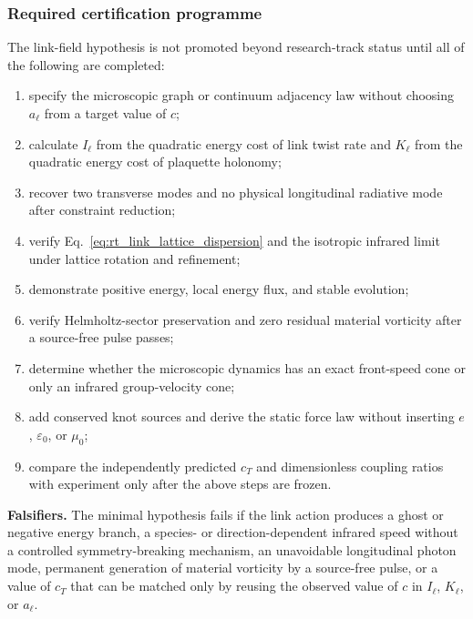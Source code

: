 \subsubsection{Required certification programme}

The link-field hypothesis is not promoted beyond research-track status until all
of the following are completed:
\begin{enumerate}
    \item specify the microscopic graph or continuum adjacency law without
    choosing $a_\ell$ from a target value of $c$;
    \item calculate $I_\ell$ from the quadratic energy cost of link twist rate
    and $K_\ell$ from the quadratic energy cost of plaquette holonomy;
    \item recover two transverse modes and no physical longitudinal radiative
    mode after constraint reduction;
    \item verify Eq.~\eqref{eq:rt_link_lattice_dispersion} and the isotropic
    infrared limit under lattice rotation and refinement;
    \item demonstrate positive energy, local energy flux, and stable evolution;
    \item verify Helmholtz-sector preservation and zero residual material
    vorticity after a source-free pulse passes;
    \item determine whether the microscopic dynamics has an exact front-speed
    cone or only an infrared group-velocity cone;
    \item add conserved knot sources and derive the static force law without
    inserting $e$, $\varepsilon_0$, or $\mu_0$;
    \item compare the independently predicted $c_T$ and dimensionless coupling
    ratios with experiment only after the above steps are frozen.
\end{enumerate}

\textbf{Falsifiers.}
The minimal hypothesis fails if the link action produces a ghost or negative
energy branch, a species- or direction-dependent infrared speed without a
controlled symmetry-breaking mechanism, an unavoidable longitudinal photon
mode, permanent generation of material vorticity by a source-free pulse, or a
value of $c_T$ that can be matched only by reusing the observed value of $c$ in
$I_\ell$, $K_\ell$, or $a_\ell$.



